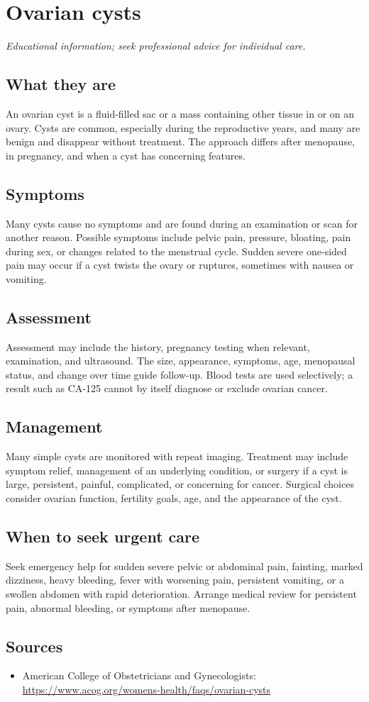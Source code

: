 \chapter{Ovarian cysts}

\medskip
\noindent\textit{Educational information; seek professional advice for individual care.}

\section*{What they are}
An ovarian cyst is a fluid-filled sac or a mass containing other tissue in or on an ovary. Cysts are common, especially during the reproductive years, and many are benign and disappear without treatment. The approach differs after menopause, in pregnancy, and when a cyst has concerning features.

\section*{Symptoms}
Many cysts cause no symptoms and are found during an examination or scan for another reason. Possible symptoms include pelvic pain, pressure, bloating, pain during sex, or changes related to the menstrual cycle. Sudden severe one-sided pain may occur if a cyst twists the ovary or ruptures, sometimes with nausea or vomiting.

\section*{Assessment}
Assessment may include the history, pregnancy testing when relevant, examination, and ultrasound. The size, appearance, symptoms, age, menopausal status, and change over time guide follow-up. Blood tests are used selectively; a result such as CA-125 cannot by itself diagnose or exclude ovarian cancer.

\section*{Management}
Many simple cysts are monitored with repeat imaging. Treatment may include symptom relief, management of an underlying condition, or surgery if a cyst is large, persistent, painful, complicated, or concerning for cancer. Surgical choices consider ovarian function, fertility goals, age, and the appearance of the cyst.

\section*{When to seek urgent care}
Seek emergency help for sudden severe pelvic or abdominal pain, fainting, marked dizziness, heavy bleeding, fever with worsening pain, persistent vomiting, or a swollen abdomen with rapid deterioration. Arrange medical review for persistent pain, abnormal bleeding, or symptoms after menopause.

\section*{Sources}
\begin{itemize}
\item American College of Obstetricians and Gynecologists: \url{https://www.acog.org/womens-health/faqs/ovarian-cysts}
\end{itemize}

